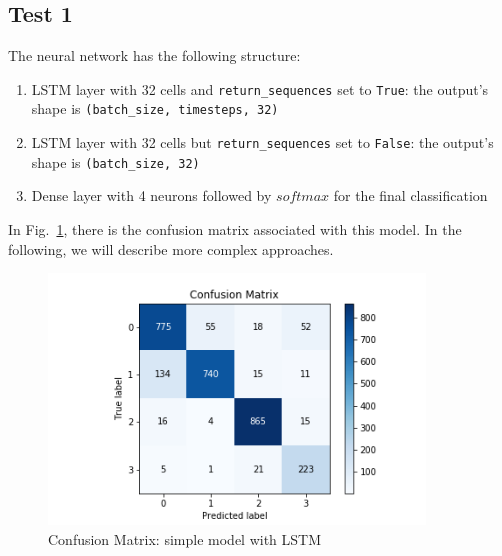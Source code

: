 \documentclass[LaM,binding=0.6cm]{sapthesis}
\begin{document}
\subsection{Test 1}
The neural network has the following structure:
\begin{enumerate}
\item LSTM layer with 32 cells and \texttt{return\_sequences} set to \texttt{True}: the output's shape is \texttt{(batch\_size, timesteps, 32)} 
\item LSTM layer with 32 cells but \texttt{return\_sequences} set to \texttt{False}: the output's shape is \texttt{(batch\_size, 32)} 
\item Dense layer with 4 neurons followed by $softmax$ for the final classification
\end{enumerate}
In Fig.~\ref{fig:lstmt1}, there is the confusion matrix associated with this model. In the following, we will describe more complex approaches.
\begin{figure} \centering
    \includegraphics[width=100mm,scale=0.7]{lstmt1}
    \caption{Confusion Matrix: simple model with LSTM}
    \label{fig:lstmt1}
\end{figure}
\end{document}
